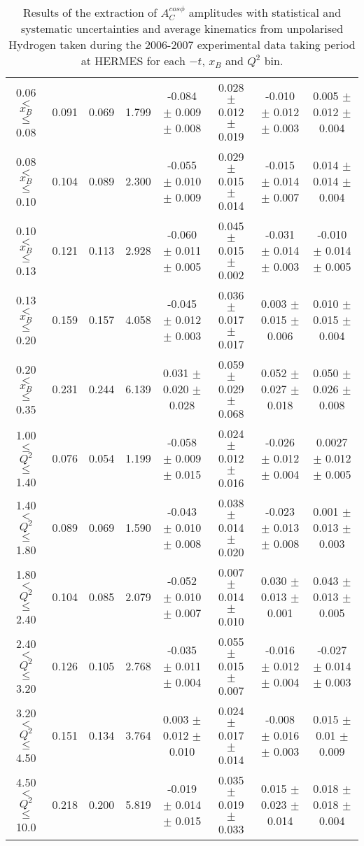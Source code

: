\begin{table}[width=15cm]
\begin{center}
{\begin{tabular}{|c|c|c|c|c|c|c|c|}
0.06 $<$ $x_{B}$ $\leqslant$ 0.08 &  0.091 & 0.069 &  1.799 &   -0.084  $\pm$  0.009  $\pm$   0.008 &
0.028  $\pm$  0.012  $\pm$   0.019 & -0.010  $\pm$ 0.012  $\pm$   0.003 & 0.005   $\pm$  0.012   $\pm$   0.004\\
0.08 $<$ $x_{B}$ $\leqslant$ 0.10 &  0.104 & 0.089 &  2.300 &  -0.055  $\pm$  0.010  $\pm$   0.009 & 
0.029  $\pm$  0.015  $\pm$   0.014 & -0.015 $\pm$  0.014 $\pm$    0.007 & 0.014   $\pm$  0.014    $\pm$  0.004\\
0.10 $<$ $x_{B}$ $\leqslant$ 0.13 &  0.121 &  0.113 &  2.928 &  -0.060  $\pm$  0.011  $\pm$   0.005 & 
0.045  $\pm$  0.015 $\pm$   0.002 & -0.031 $\pm$  0.014  $\pm$   0.003 & -0.010   $\pm$  0.014  $\pm$    0.005\\
0.13 $<$ $x_{B}$ $\leqslant$ 0.20 &  0.159 & 0.157 &  4.058&   -0.045   $\pm$ 0.012  $\pm$   0.003 & 
0.036  $\pm$  0.017 $\pm$    0.017 & 0.003  $\pm$  0.015  $\pm$   0.006 & 0.010   $\pm$  0.015   $\pm$  0.004\\
0.20 $<$ $x_{B}$ $\leqslant$ 0.35 &  0.231 & 0.244 &  6.139 &  0.031 $\pm$  0.020   $\pm$  0.028 & 
0.059  $\pm$  0.029   $\pm$    0.068 & 0.052  $\pm$  0.027  $\pm$   0.018 & 0.050  $\pm$   0.026  $\pm$   0.008\\
\hline
1.00 $\leqslant$ $Q^{2}$ $\leqslant$ 1.40 &  0.076 & 0.054  & 1.199 &  -0.058  $\pm$  0.009  $\pm$   0.015 & 
0.024  $\pm$  0.012  $\pm$   0.016 &  -0.026 $\pm$  0.012  $\pm$  0.004 & 0.0027  $\pm$  0.012   $\pm$   0.005\\
1.40 $<$ $Q^{2}$ $\leqslant$ 1.80 &  0.089 & 0.069 &  1.590 &  -0.043  $\pm$  0.010  $\pm$   0.008 & 
0.038  $\pm$  0.014  $\pm$   0.020 & -0.023  $\pm$  0.013  $\pm$  0.008 & 0.001  $\pm$  0.013   $\pm$  0.003\\
1.80 $<$ $Q^{2}$ $\leqslant$ 2.40 &  0.104 & 0.085 &  2.079 &  -0.052  $\pm$  0.010  $\pm$   0.007 &
 0.007  $\pm$  0.014  $\pm$   0.010 & 0.030 $\pm$   0.013  $\pm$  0.001 & 0.043  $\pm$   0.013  $\pm$  0.005\\
2.40 $<$ $Q^{2}$ $\leqslant$ 3.20 &  0.126 & 0.105  & 2.768 &  -0.035 $\pm$   0.011  $\pm$   0.004 &  
0.055  $\pm$  0.015  $\pm$   0.007 & -0.016  $\pm$  0.012  $\pm$  0.004 & -0.027  $\pm$  0.014  $\pm$  0.003\\
3.20 $<$ $Q^{2}$ $\leqslant$ 4.50 &  0.151 & 0.134 &  3.764 &  0.003  $\pm$  0.012   $\pm$  0.010 & 
0.024 $\pm$   0.017  $\pm$   0.014 & -0.008  $\pm$  0.016 $\pm$ 0.003 & 0.015   $\pm$  0.01  $\pm$  0.009\\
4.50 $<$ $Q^{2}$ $\leqslant$ 10.0 &  0.218 & 0.200 &  5.819 &  -0.019  $\pm$  0.014  $\pm$   0.015 & 
0.035  $\pm$  0.019  $\pm$  0.033 & 0.015 $\pm$   0.023  $\pm$  0.014 & 0.018   $\pm$  0.018   $\pm$   0.004\\
\hline
  \end{tabular}
}
 \end{center}
\caption{Results of the extraction of $A_{C}^{cos\phi}$ amplitudes with statistical and systematic uncertainties and average kinematics from unpolarised Hydrogen taken during
the 2006-2007 experimental data taking period at HERMES for each $-t$, $x_{B}$ and $Q^{2}$ bin.}
\end{table}

